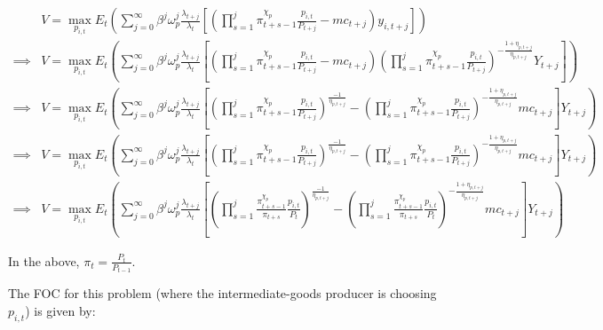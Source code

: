 \documentclass[article,11pt,letterpaper,fleqn]{article}
\theoremstyle{definition}
\numberwithin{equation}{section}
\begin{document}
\begin{equation}
\begin{split}
 & V=\max_{p_{i,t}} E_{t}\left(\sum_{j=0}^{\infty}\beta^{j}\omega^{j}_{p}\frac{\lambda_{t+j}}{\lambda_{t}}\left[\left(\prod_{s=1}^{j}\pi^{\chi_{p}}_{t+s-1}\frac{p_{i,t}}{P_{t+j}}-mc_{t+j}\right)y_{i,t+j}\right]\right) 
\\
\implies & V=\max_{p_{i,t}} E_{t}\left(\sum_{j=0}^{\infty} \beta^{j}\omega^{j}_{p}\frac{\lambda_{t+j}}{\lambda_{t}}\left[\left(\prod_{s=1}^{j}\pi^{\chi_{p}}_{t+s-1}\frac{p_{i,t}}{P_{t+j}}-mc_{t+j}\right)\left(\prod_{s=1}^{j}\pi^{\chi_{p}}_{t+s-1}\frac{p_{i,t}}{P_{t+j}}\right)^{-\frac{1+\eta_{p,t+j}}{\eta_{p,t+j}}}Y_{t+j}\right]\right) \\
 \implies & V=\max_{p_{i,t}} E_{t}\left(\sum_{j=0}^{\infty} \beta^{j}\omega^{j}_{p}\frac{\lambda_{t+j}}{\lambda_{t}}\left[\left(\prod_{s=1}^{j}\pi^{\chi_{p}}_{t+s-1}\frac{p_{i,t}}{P_{t+j}}\right)^{\frac{-1}{\eta_{p,t+j}}}-\left(\prod_{s=1}^{j}\pi^{\chi_{p}}_{t+s-1}\frac{p_{i,t}}{P_{t+j}}\right)^{-\frac{1+\eta_{p,t+j}}{\eta_{p,t+j}}}mc_{t+j}\right]Y_{t+j}\right) \\
 \implies & V=\max_{p_{i,t}} E_{t}\left(\sum_{j=0}^{\infty} \beta^{j}\omega^{j}_{p}\frac{\lambda_{t+j}}{\lambda_{t}}\left[\left(\prod_{s=1}^{j}\pi^{\chi_{p}}_{t+s-1}\frac{p_{i,t}}{P_{t+j}}\right)^{\frac{-1}{\eta_{p,t+j}}}-\left(\prod_{s=1}^{j}\pi^{\chi_{p}}_{t+s-1}\frac{p_{i,t}}{P_{t+j}}\right)^{-\frac{1+\eta_{p,t+j}}{\eta_{p,t+j}}}mc_{t+j}\right]Y_{t+j}\right) \\
  \implies & V=\max_{p_{i,t}} E_{t}\left(\sum_{j=0}^{\infty} \beta^{j}\omega^{j}_{p}\frac{\lambda_{t+j}}{\lambda_{t}}\left[\left(\prod_{s=1}^{j}\frac{\pi^{\chi_{p}}_{t+s-1}}{\pi_{t+s}}\frac{p_{i,t}}{P_{t}}\right)^{\frac{-1}{\eta_{p,t+j}}}-\left(\prod_{s=1}^{j}\frac{\pi^{\chi_{p}}_{t+s-1}}{\pi_{t+s}}\frac{p_{i,t}}{P_{t}}\right)^{-\frac{1+\eta_{p,t+j}}{\eta_{p,t+j}}}mc_{t+j}\right]Y_{t+j}\right) 
\end{split}
\end{equation}

In the above, $\pi_{t}=\frac{P_{t}}{P_{t-1}}$.

The FOC for this problem (where the intermediate-goods producer is choosing $p_{i,t}$) is given by:
\end{document}
